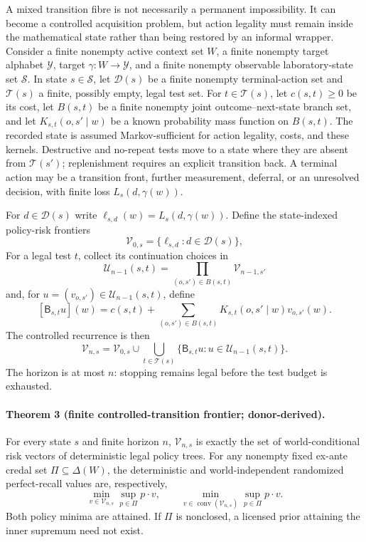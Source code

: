A mixed transition fibre is not necessarily a permanent impossibility.  It can
become a controlled acquisition problem, but action legality must remain inside
the mathematical state rather than being restored by an informal wrapper.
Consider a finite nonempty active context set $W$, a finite nonempty target
alphabet $\mathcal Y$, target $\gamma:W\to\mathcal Y$, and a finite nonempty
observable laboratory-state set $\mathcal S$.  In state $s\in\mathcal S$, let
$\mathcal D(s)$ be a finite nonempty terminal-action set and $\mathcal T(s)$ a
finite, possibly empty, legal test set.  For $t\in\mathcal T(s)$, let
$c(s,t)\geq0$ be its cost, let $B(s,t)$ be a finite nonempty joint
outcome--next-state branch set, and let $K_{s,t}(o,s'\mid w)$ be a known
probability mass function on $B(s,t)$.  The recorded state is assumed
Markov-sufficient for action legality, costs, and these kernels.  Destructive
and no-repeat tests move to a state where they are absent from
$\mathcal T(s')$; replenishment requires an explicit transition back.  A
terminal action may be a transition front, further measurement, deferral, or
an unresolved decision, with finite loss $L_s(d,\gamma(w))$.

For $d\in\mathcal D(s)$ write
$\ell_{s,d}(w)=L_s(d,\gamma(w))$.  Define the state-indexed policy-risk
frontiers
\[
 \mathcal V_{0,s}=\{\ell_{s,d}:d\in\mathcal D(s)\},
\]
For a legal test $t$, collect its continuation choices in
\[
 \mathcal U_{n-1}(s,t)=
 \prod_{(o,s')\in B(s,t)}\mathcal V_{n-1,s'}
\]
and, for $u=(v_{o,s'})\in\mathcal U_{n-1}(s,t)$, define
\[
 [\mathsf B_{s,t}u](w)=c(s,t)+
 \sum_{(o,s')\in B(s,t)}
 K_{s,t}(o,s'\mid w)v_{o,s'}(w).
\]
The controlled recurrence is then
\[
 \mathcal V_{n,s}=\mathcal V_{0,s}\cup
 \bigcup_{t\in\mathcal T(s)}
 \{\mathsf B_{s,t}u:u\in\mathcal U_{n-1}(s,t)\}.
\]
The horizon is at most $n$: stopping remains legal before the test budget is
exhausted.

\paragraph{Theorem 3 (finite controlled-transition frontier; donor-derived).}
For every state $s$ and finite horizon $n$, $\mathcal V_{n,s}$ is exactly the
set of world-conditional risk vectors of deterministic legal policy trees.
For any nonempty fixed ex-ante credal set $\Pi\subseteq\Delta(W)$, the
deterministic and world-independent randomized perfect-recall values are,
respectively,
\[
 \min_{v\in\mathcal V_{n,s}}\sup_{p\in\Pi}p\!\cdot\!v,
 \qquad
 \min_{v\in\operatorname{conv}(\mathcal V_{n,s})}
      \sup_{p\in\Pi}p\!\cdot\!v.
\]
Both policy minima are attained.  If $\Pi$ is nonclosed, a licensed prior
attaining the inner supremum need not exist.

